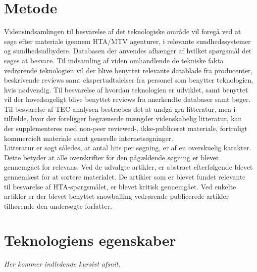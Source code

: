 \section{Metode \citep{HTAcore}}
Vidensindsamlingen til besvarelse af det teknologiske område vil foregå ved at søge efter materiale igennem HTA/MTV agenturer, i relevante sundhedssystemer og sundhedsudbydere. Databasen der anvendes afhænger af hvilket spørgsmål det søges at besvare. Til indsamling af viden omhandlende de tekniske fakta vedrørende teknologien vil der blive benyttet relevante datablade fra producenter, beskrivende reviews samt ekspertudtalelser fra personel som benytter teknologien, hvis nødvendig. Til besvarelse af hvordan teknologien er udviklet, samt benyttet vil der hovedsageligt blive benyttet reviews fra anerkendte databaser samt bøger.  \\
Til besvarelse af TEC-analysen bestræbes det at undgå grå litteratur, men i tilfælde, hvor der foreligger begrænsede mængder videnskabelig litteratur, kan der supplementeres med non-peer reviewed-, ikke-publiceret materiale, fortroligt kommercielt materiale samt generelle internetsøgninger. \\
Litteratur er søgt således, at antal hits per søgning, er af en overskuelig karakter. Dette betyder at alle overskrifter for den pågældende søgning er blevet gennemgået for relevans. Ved de udvalgte artikler, er abstract efterfølgende blevet gennemlæst for at sortere materialet. De artikler som er blevet fundet relevante til besvarelse af HTA-spørgsmålet, er blevet kritisk gennemgået. Ved enkelte artikler er der blevet benyttet snowballing vedrørende publicerede artikler tilhørende den undersøgte forfatter. 

\section{Teknologiens egenskaber}
\textit{Her kommer indledende kursivt afsnit.}

